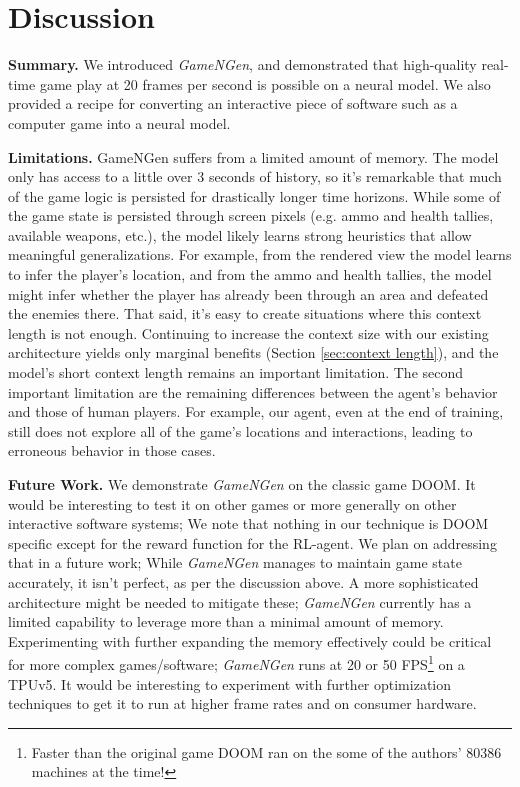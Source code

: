 \documentclass{article} %
\begin{document}
\section{Discussion}
\label{sec:discussion}

\textbf{Summary.} We introduced \emph{GameNGen}, and demonstrated that high-quality real-time game play at 20 frames per second is possible on a neural model.
We also provided a recipe for converting an interactive piece of software such as a computer game into a neural model.

\textbf{Limitations.} GameNGen suffers from a limited amount of memory.
The model only has access to a little over 3 seconds of history, so it's remarkable that much of the game logic is persisted for drastically longer time horizons.
While some of the game state is persisted through screen pixels  (e.g. ammo and health tallies, available weapons, etc.), the model likely learns strong heuristics that allow meaningful generalizations.
For example, from the rendered view the model learns to infer the player's location, and from the ammo and health tallies, the model might infer whether the player has already been through an area and defeated the enemies there.
That said, it's easy to create situations where this context length is not enough.
Continuing to increase the context size with our existing architecture yields only marginal benefits (Section \ref{sec:context length}), and the model's short context length remains an important limitation.
The second important limitation are the remaining differences between the agent's behavior and those of human players. For example, our agent, even at the end of training, still does not explore all of the game's locations and interactions, leading to erroneous behavior in those cases.

\textbf{Future Work.} We demonstrate \emph{GameNGen} on the classic game DOOM.
It would be interesting to test it on other games or more generally on other interactive software systems;
We note that nothing in our technique is DOOM specific except for the reward function for the RL-agent. We plan on addressing that in a future work;
While \emph{GameNGen} manages to maintain game state accurately, it isn't perfect, as per the discussion above. A more sophisticated architecture might be needed to mitigate these;
\emph{GameNGen} currently has a limited capability to leverage more than a minimal amount of memory. Experimenting with further expanding the memory effectively could be critical for more complex games/software;
\emph{GameNGen} runs at 20 or 50 FPS\footnote{Faster than the original game DOOM ran on the some of the authors' 80386 machines at the time!} on a TPUv5. It would be interesting to experiment with further optimization techniques to get it to run at higher frame rates and on consumer hardware.
\end{document}
